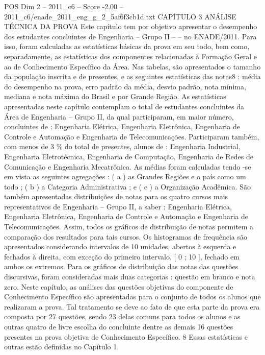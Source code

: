 \begin{textsample}{POS Dim 2 – 2011\_c6 – Score -2.00 – 2011\_c6/enade\_2011\_eng\_g\_2\_5af6f3cb1d.txt}  \label{ex:f2_pos_409}
CAPÍTULO 3 ANÁLISE TÉCNICA DA PROVA Este capítulo tem por objetivo apresentar o desempenho dos estudantes concluintes de Engenharia – Grupo II – – no ENADE/2011.
Para isso, foram calculadas as estatísticas básicas da prova em seu todo, bem como, separadamente, as estatísticas dos componentes relacionadas à Formação Geral e ao de Conhecimento Específico da Área.
Nas tabelas, são apresentados o tamanho da população inscrita e de presentes, e as seguintes estatísticas das notas8 : média do desempenho na prova, erro padrão da média, desvio padrão, nota mínima, mediana e nota máxima do Brasil e por Grande Região.
As estatísticas apresentadas neste capítulo contemplam o total de estudantes concluintes da Área de Engenharia – Grupo II, da qual participaram, em maior número, concluintes de : Engenharia Elétrica, Engenharia Eletrônica, Engenharia de Controle e Automação e Engenharia de Telecomunicações.
Participaram também, com menos de 3 \% do total de presentes, alunos de : Engenharia Industrial, Engenharia Eletrotécnica, Engenharia de Computação, Engenharia de Redes de Comunicação e Engenharia Mecatrônica.
As médias foram calculadas tendo -se em vista as seguintes agregações : ( a ) as Grandes Regiões e o país como um todo ; ( b ) a Categoria Administrativa ; e ( c ) a Organização Acadêmica.
São também apresentadas distribuições de notas para os quatro cursos mais representativos de Engenharia – Grupo II, a saber : Engenharia Elétrica, Engenharia Eletrônica, Engenharia de Controle e Automação e Engenharia de Telecomunicações.
Assim, todos os gráficos de distribuição de notas permitem a comparação dos resultados para tais cursos.
Os histogramas de frequência são apresentados considerando intervalos de 10 unidades, abertos à esquerda e fechados à direita, com exceção do primeiro intervalo, [ 0 ; 10 ], fechado em ambos os extremos.
Para os gráficos de distribuição das notas das questões discursivas, foram consideradas mais duas categorias : questão em branco e nota zero.
Neste capítulo, as análises das questões objetivas do componente de Conhecimento Específico são apresentadas para o conjunto de todos os alunos que realizaram a prova.
Tal tratamento se deve ao fato de que esta parte da prova era composta por 27 questões, sendo 23 delas comuns para todos os alunos e as outras quatro de livre escolha do concluinte dentre as demais 16 questões presentes na prova objetiva de Conhecimento Específico. 8 Essas estatísticas e outras estão definidas no Capítulo 1.

\end{textsample}
